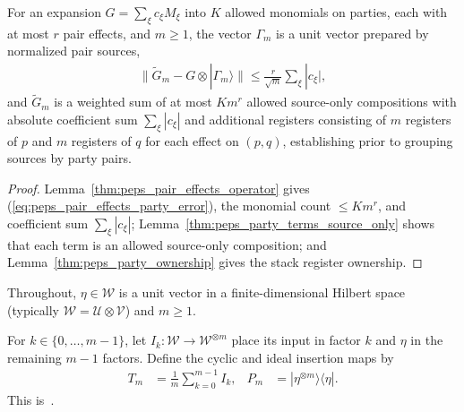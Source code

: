 \begin{theorem}
    \label{thm:peps_pair_effects_party}
    \leanok
    For an expansion $G=\sum_\xi c_\xi M_\xi$ into $K$ allowed monomials on
    parties, each with at most $r$ pair effects, and $m\ge1$, the vector
    $\Gamma_m$ is a unit vector prepared by normalized pair sources,
    \begin{align}
        \bigl\|\widetilde G_m-G\otimes|\Gamma_m\rangle\bigr\|
        \le\frac r{\sqrt m}\sum_\xi|c_\xi|,
        \label{eq:peps_pair_effects_party_error}
    \end{align}
    and $\widetilde G_m$ is a weighted sum of at most $Km^r$ allowed
    source-only compositions with absolute coefficient sum $\sum_\xi|c_\xi|$
    and additional registers consisting of $m$ registers of $p$ and $m$
    registers of $q$ for each effect on $(p,q)$, establishing
    \cite[Lemma~5.1]{OpenAI2026PolynomialPEPS} prior to grouping sources by
    party pairs.
\end{theorem}

\begin{proof}\leanok
    Lemma~\ref{thm:peps_pair_effects_operator} gives
    (\ref{eq:peps_pair_effects_party_error}), the monomial count $\le Km^r$, and
    coefficient sum $\sum_\xi|c_\xi|$; Lemma~\ref{thm:peps_party_terms_source_only}
    shows that each term is an allowed source-only composition; and
    Lemma~\ref{thm:peps_party_ownership} gives the stack register ownership.
\end{proof}

Throughout, $\eta\in\mathcal W$ is a unit vector in a finite-dimensional
Hilbert space (typically $\mathcal W=\mathcal U\otimes\mathcal V$) and $m\ge1$.

\begin{definition}
    \label{def:peps_cyclic_insertion}
    \leanok
    For $k\in\{0,\dots,m-1\}$, let $I_k:\mathcal W\to\mathcal W^{\otimes m}$
    place its input in factor $k$ and $\eta$ in the remaining $m-1$ factors.
    Define the cyclic and ideal insertion maps by
    \begin{align}
        T_m & =\frac1m\sum_{k=0}^{m-1} I_k,          &
        P_m & =|\eta^{\otimes m}\rangle\langle\eta|.
        \label{eq:peps_cyclic_insertion}
    \end{align}
    This is~\cite[``Cyclic insertion map'']{QICLean2026Blueprint}.
\end{definition}

